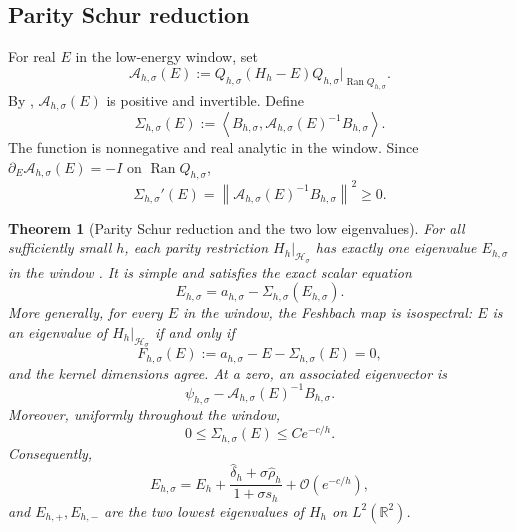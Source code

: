 \documentclass[11pt]{article}
\newtheorem{theorem}{Theorem}[section]
\newcommand{\R}{\mathbb R}
\newcommand{\cO}{\mathcal O}
\newcommand{\ip}[2]{\left\langle #1,#2\right\rangle}
\newcommand{\Ran}{\operatorname{Ran}}
\begin{document}
\subsection{Parity Schur reduction}\label{sec:parity-schur-reduction}
For real $E$ in the low-energy window, set
\begin{equation}\label{eq:A-compressed}
 \mathcal A_{h,\sigma}(E)
 :=Q_{h,\sigma}(H_h-E)Q_{h,\sigma}
 \big|_{\Ran Q_{h,\sigma}}.
\end{equation}
By ,
$\mathcal A_{h,\sigma}(E)$ is positive and invertible.  Define
\begin{equation}\label{eq:Sigma}
 \Sigma_{h,\sigma}(E)
 :=\ip{B_{h,\sigma}}
 {\mathcal A_{h,\sigma}(E)^{-1}B_{h,\sigma}}.
\end{equation}
The function is nonnegative and real analytic in the window.  Since
$\partial_E\mathcal A_{h,\sigma}(E)=-I$ on $\Ran Q_{h,\sigma}$,
\begin{equation}\label{eq:Sigma-derivative}
 \Sigma_{h,\sigma}'(E)
 =\left\|
 \mathcal A_{h,\sigma}(E)^{-1}B_{h,\sigma}
 \right\|^2\ge0.
\end{equation}

\begin{theorem}[Parity Schur reduction and the two low eigenvalues]
\label{thm:parity-schur}
For all sufficiently small $h$, each parity restriction
$H_h|_{\mathcal H_\sigma}$ has exactly one eigenvalue
$E_{h,\sigma}$ in the window .  It is simple and
satisfies the exact scalar equation
\begin{equation}\label{eq:schur-equation}
 E_{h,\sigma}
 =a_{h,\sigma}-\Sigma_{h,\sigma}(E_{h,\sigma}).
\end{equation}
More generally, for every $E$ in the window, the Feshbach map is isospectral:
$E$ is an eigenvalue of $H_h|_{\mathcal H_\sigma}$ if and only if
\begin{equation}\label{eq:scalar-feshbach-function}
 F_{h,\sigma}(E)
 :=a_{h,\sigma}-E-\Sigma_{h,\sigma}(E)=0,
\end{equation}
and the kernel dimensions agree.  At a zero, an associated eigenvector is
\begin{equation}\label{eq:feshbach-eigenvector}
 \psi_{h,\sigma}
 -\mathcal A_{h,\sigma}(E)^{-1}B_{h,\sigma}.
\end{equation}
Moreover, uniformly throughout the window,
\begin{equation}\label{eq:feshbach-envelope-certificate}
 0\leq\Sigma_{h,\sigma}(E)
 \leq C e^{-c/h}.
\end{equation}
Consequently,
\begin{equation}\label{eq:E-sigma-expansion}
 E_{h,\sigma}
 =E_h+\frac{\widehat\delta_h+\sigma\widehat\rho_h}
 {1+\sigma s_h}
 +\cO\!\left(e^{-c/h}\right),
\end{equation}
and $E_{h,+},E_{h,-}$ are the two lowest eigenvalues of $H_h$ on
$L^2(\R^2)$.
\end{theorem}
\end{document}
